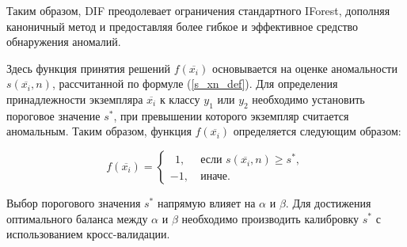 Таким образом, DIF преодолевает ограничения стандартного IForest, дополняя каноничный метод и предоставляя более гибкое и эффективное средство обнаружения аномалий.

Здесь функция принятия решений $f(\overline{x_i})$ основывается на оценке аномальности $s(\overline{x_i}, n)$, рассчитанной по формуле (\ref{s_xn_def}). Для определения принадлежности экземпляра $\overline{x_i}$ к классу $y_1$ или $y_2$ необходимо установить пороговое значение $s^*$, при превышении которого экземпляр считается аномальным. Таким образом, функция $f(\overline{x_i})$ определяется следующим образом:

\begin{equation}\label{f_iforest_def}
    f(\overline{x_i}) = \begin{cases}
         \ \ 1, &\ \text{если } s(\overline{x_i}, n) \geq s^*, \\
               -1, &\ \text{иначе}.
         \end{cases}
\end{equation}

Выбор порогового значения $s^*$ напрямую влияет на $\alpha$ и $\beta$. Для достижения оптимального баланса между $\alpha$ и $\beta$ необходимо производить калибровку $s^*$ с использованием кросс-валидации.
